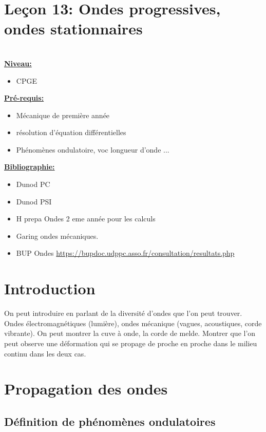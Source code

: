 \documentclass[french, a4paper, 10pt, twocolumn, landscape]{article}
\begin{document}
\section*{Leçon 13: Ondes progressives, ondes stationnaires}

\hrulefill\\

\noindent\underline{\textbf{Niveau:}}
\begin{itemize}
  \item CPGE 
\end{itemize}
\underline{\textbf{Pr{\'e}-requis: }}

\begin{itemize}  
\item Mécanique de première année
\item résolution d'équation différentielles
\item Phénomènes ondulatoire, voc longueur d'onde ...
\end{itemize}
\underline{\textbf{Bibliographie:}}

\begin{itemize}
  \item Dunod PC
  \item Dunod PSI
  \item H prepa Ondes 2 eme année pour les calculs
  \item Garing ondes mécaniques.
  \item BUP Ondes \url{https://bupdoc.udppc.asso.fr/consultation/resultats.php}
\end{itemize}
\hrulefill

\section*{Introduction}

On peut introduire en parlant de la diversité d'ondes que l'on peut trouver.
Ondes électromagnétiques (lumière), ondes mécanique (vagues, acoustiques, corde vibrante). 
On peut montrer la cuve à onde, la corde de melde. Montrer que l'on peut observe une déformation qui se propage de proche en proche dans le milieu continu dans les deux cas. 

\section*{Propagation des ondes}

\subsection*{Définition de phénomènes ondulatoires}
\end{document}

